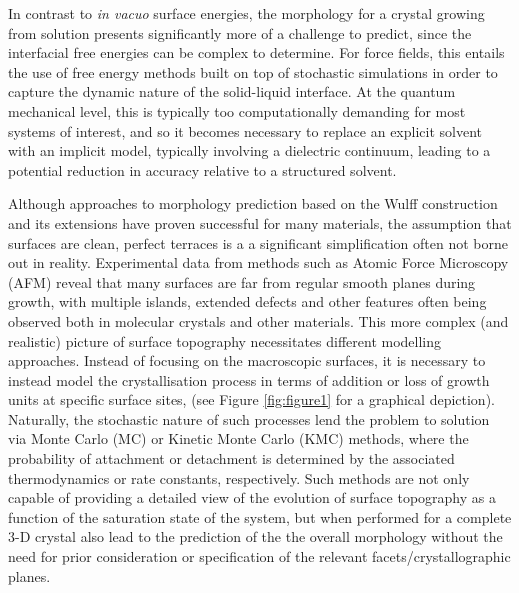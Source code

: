 \documentclass[twoside,twocolumn,9pt]{article}
\begin{document}
In contrast to \emph{in vacuo} surface energies, the morphology for a crystal growing from solution presents significantly more of a challenge to predict, since the interfacial free energies can be complex to determine. For force fields, this entails the use of free energy methods built on top of stochastic simulations in order to capture the dynamic nature of the solid-liquid interface.\cite{Yeandel2022} At the quantum mechanical level, this is typically too computationally demanding for most systems of interest, and so it becomes necessary to replace an explicit solvent with an implicit model, typically involving a dielectric continuum,\cite{Delley2006,Andreussi2014} leading to a potential reduction in accuracy relative to a structured solvent. 

Although approaches to morphology prediction based on the Wulff construction and its extensions have proven successful for many materials, the assumption that surfaces are clean, perfect terraces is a a significant simplification often not borne out in reality. Experimental data from methods such as Atomic Force Microscopy (AFM) reveal that many surfaces are far from regular smooth planes during growth, with multiple islands, extended defects and other features often being observed both in molecular crystals and other materials\cite{Yip1996, McPherson2000, Chow2012, Musumeci2011, Choudhary2020,Agger1998,Agger2001,Shoaee2008}.
This more complex (and realistic) picture of surface topography necessitates different modelling approaches. Instead of focusing on the macroscopic surfaces, it is necessary to instead model the crystallisation process in terms of addition or loss of growth units at specific surface sites, (see Figure \ref{fig:figure1} for a graphical depiction). Naturally, the stochastic nature of such processes lend the problem to solution via Monte Carlo (MC) or Kinetic Monte Carlo (KMC) methods,\cite{Boerrigter2004,Kurganskaya2022} where the probability of attachment or detachment is determined by the associated thermodynamics or rate constants, respectively. Such methods are not only capable of providing a detailed view of the evolution of surface topography as a function of the saturation state of the system, but when performed for a complete 3-D crystal also lead to the prediction of the the overall morphology without the need for prior consideration or specification of the relevant facets/crystallographic planes.\cite{Piana2005Nature}
\end{document}
